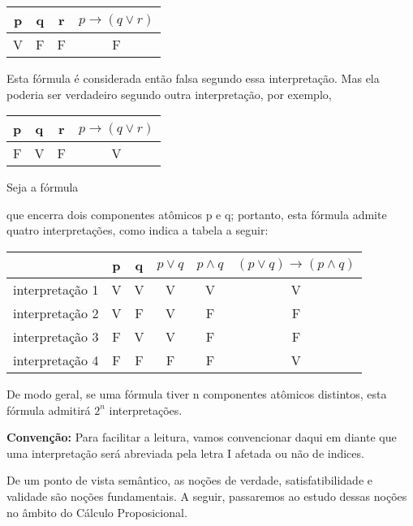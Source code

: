 \begin{center}
    \begin{tabular}{c c c c}
        p & q & r & $p \to (q \lor r)$ \\ \hline
        V & F & F & F
    \end{tabular}
\end{center}

Esta fórmula é considerada então falsa segundo essa interpretação.
Mas ela poderia ser verdadeiro segundo outra interpretação, por exemplo,

\begin{center}
    \begin{tabular}{c c c c}
        p & q & r & $p \to (q \lor r)$ \\ \hline
        F & V & F & V
    \end{tabular}
\end{center}

\begin{exemplo} \label{cap3-exemplo2}
    Seja a fórmula 
\end{exemplo}
\noindent que encerra dois componentes atômicos p e q; portanto, esta fórmula admite quatro interpretações, como indica a tabela a seguir:

\begin{center}
    \begin{tabular}{c | c c c c c}
                        & p & q & $p \lor q$ & $p \land q$ & $(p \lor q) \to (p \land q)$ \\ \hline
        interpretação 1 & V & V & V          & V            & V \\
        interpretação 2 & V & F & V          & F            & F \\
        interpretação 3 & F & V & V          & F            & F \\
        interpretação 4 & F & F & F          & F            & V
    \end{tabular}
\end{center}

De modo geral, se uma fórmula tiver n componentes atômicos distintos, esta fórmula admitirá $2^n$ interpretações.

\bigskip
\noindent
\textbf{Convenção:} Para facilitar a leitura, vamos convencionar daqui em diante que uma interpretação será abreviada pela letra I afetada ou não de indices.

De um ponto de vista semântico, as noções de verdade, satisfatibilidade e validade são noções fundamentais.
A seguir, passaremos ao estudo dessas noções no  âmbito do Cálculo Proposicional.

